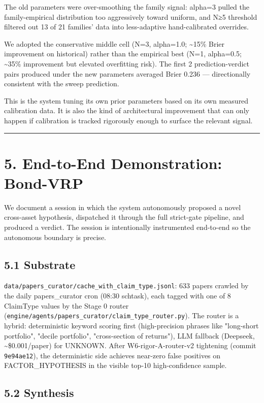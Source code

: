 \documentclass[11pt,a4paper]{article}
\begin{document}
The old parameters were over-smoothing the family signal: alpha=3 pulled the family-empirical distribution too aggressively toward uniform, and N≥5 threshold filtered out 13 of 21 families' data into less-adaptive hand-calibrated overrides.

We adopted the conservative middle cell (N=3, alpha=1.0; \textasciitilde{}15\% Brier improvement on historical) rather than the empirical best (N=1, alpha=0.5; \textasciitilde{}35\% improvement but elevated overfitting risk). The first 2 prediction-verdict pairs produced under the new parameters averaged Brier 0.236 — directionally consistent with the sweep prediction.

This is the system tuning its own prior parameters based on its own measured calibration data. It is also the kind of architectural improvement that can only happen if calibration is tracked rigorously enough to surface the relevant signal.

\medskip\hrule\medskip

\section{5. End-to-End Demonstration: Bond-VRP}

We document a session in which the system autonomously proposed a novel cross-asset hypothesis, dispatched it through the full strict-gate pipeline, and produced a verdict. The session is intentionally instrumented end-to-end so the autonomous boundary is precise.

\subsection{5.1 Substrate}

\texttt{data/papers\_curator/cache\_with\_claim\_type.jsonl}: 633 papers crawled by the daily papers\_curator cron (08:30 schtask), each tagged with one of 8 ClaimType values by the Stage 0 router (\texttt{engine/agents/papers\_curator/claim\_type\_router.py}). The router is a hybrid: deterministic keyword scoring first (high-precision phrases like "long-short portfolio", "decile portfolio", "cross-section of returns"), LLM fallback (Deepseek, \textasciitilde{}\$0.001/paper) for UNKNOWN. After W6-rigor-A-router-v2 tightening (commit \texttt{9e94ae12}), the deterministic side achieves near-zero false positives on FACTOR\_HYPOTHESIS in the visible top-10 high-confidence sample.

\subsection{5.2 Synthesis}
\end{document}
